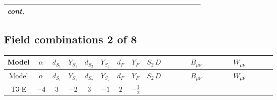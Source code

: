 \documentclass[8pt]{article}
\begin{document}
\begin{landscape}
\begin{longtable}{@{}cccccccc >{\raggedright\arraybackslash}p{0.21\linewidth} >{\raggedright\arraybackslash}p{0.21\linewidth} >{\raggedright\arraybackslash}p{0.21\linewidth}@{}}
\textit{cont.} &  &  &  &  &  &  &  & \scriptsize\adjustbox{max width=\linewidth}{$\begin{gathered} -\frac{2 \hbar  \overline{y_{1,i_1,r_1}} S_{1,j_3} S_{1,j_4} y_{1,i_1,r_1} S_{1,j_1}{}^{\dagger } S_{1,j_2}{}^{\dagger } \mathcal{I}_{S_1,j_1,j_3,j_2,j_4}{}^2 \lambda_{S_1}^{(1)}^{(2)}}{\sqrt{3} \epsilon } \\ -\frac{\hbar  \overline{y_{1,i_1,r_1}} S_{1,j_3} S_{1,j_4} y_{1,i_1,r_1} S_{1,j_1}{}^{\dagger } S_{1,j_2}{}^{\dagger } \mathcal{I}_{S_1,j_1,j_3,j_2,j_4}{}^2 \lambda_{S_1}^{(1)}^{(2)}}{\sqrt{3}}\end{gathered}$} &  & \scriptsize\adjustbox{max width=\linewidth}{$\begin{gathered} -\frac{2 \hbar  \overline{y_{2,i_1,r_1}} S_{2,j_3} S_{2,j_4} y_{2,i_1,r_1} S_{2,j_1}{}^{\dagger } S_{2,j_2}{}^{\dagger } \mathcal{I}_{S_2,j_1,j_3,j_2,j_4}{}^2 \lambda_{S_2}^{(1)}^{(2)}}{\sqrt{3} \epsilon } \\ -\frac{\hbar  \overline{y_{2,i_1,r_1}} S_{2,j_3} S_{2,j_4} y_{2,i_1,r_1} S_{2,j_1}{}^{\dagger } S_{2,j_2}{}^{\dagger } \mathcal{I}_{S_2,j_1,j_3,j_2,j_4}{}^2 \lambda_{S_2}^{(1)}^{(2)}}{\sqrt{3}}\end{gathered}$} \\
\midrule
\bottomrule
\end{longtable}
\clearpage
\subsection*{Field combinations 2 of 8}
\begin{longtable}{@{}cccccccc >{\raggedright\arraybackslash}p{0.21\linewidth} >{\raggedright\arraybackslash}p{0.21\linewidth} >{\raggedright\arraybackslash}p{0.21\linewidth}@{}}
\toprule
Model & $\alpha$ & $d_{S_1}$ & $Y_{S_1}$ & $d_{S_2}$ & $Y_{S_2}$ & $d_F$ & $Y_F$ & $S_2\,D$ & $B_{\mu\nu}$ & $W_{\mu\nu}$ \\
\midrule
\endfirsthead
\toprule
Model & $\alpha$ & $d_{S_1}$ & $Y_{S_1}$ & $d_{S_2}$ & $Y_{S_2}$ & $d_F$ & $Y_F$ & $S_2\,D$ & $B_{\mu\nu}$ & $W_{\mu\nu}$ \\
\midrule
\endhead
T3-E & $-4$ & $3$ & $-2$ & $3$ & $-1$ & $2$ & $-\frac{3}{2}$ & \scriptsize\adjustbox{max width=\linewidth}{$\begin{gathered} +D_{\mu _1}\left(S_{2,j_1}\right){}^{\dagger } D_{\mu _1}\left(S_{2,j_1}\right)\end{gathered}$} & \scriptsize\adjustbox{max width=\linewidth}{$\begin{gathered} -\frac{9 \hbar  B_{\mu _1\mu _2}^2}{2 \epsilon }\end{gathered}$} & \scriptsize\adjustbox{max width=\linewidth}{$\begin{gathered} -\frac{\hbar  \left(W_{\mu _1\mu _2}^{A_1}\right){}^2}{2 \epsilon }\end{gathered}$} \\
\midrule
\bottomrule
\end{longtable}
\clearpage

\end{landscape}
\end{document}
